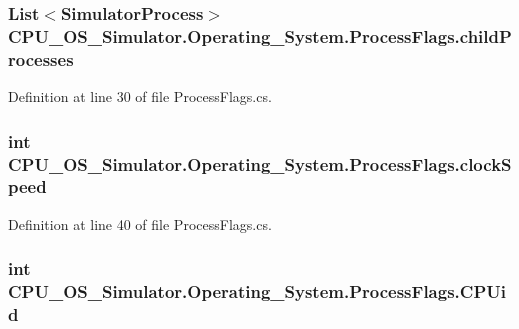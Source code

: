 \subsubsection[{child\+Processes}]{\setlength{\rightskip}{0pt plus 5cm}List$<${\bf Simulator\+Process}$>$ C\+P\+U\+\_\+\+O\+S\+\_\+\+Simulator.\+Operating\+\_\+\+System.\+Process\+Flags.\+child\+Processes}\label{struct_c_p_u___o_s___simulator_1_1_operating___system_1_1_process_flags_aae4b90a688d3ac4e6d3faea6cb275242}


Definition at line 30 of file Process\+Flags.\+cs.

\hypertarget{struct_c_p_u___o_s___simulator_1_1_operating___system_1_1_process_flags_a28dbea54b61ff7f12d5dc8c3c40f632d}{}
\subsubsection[{clock\+Speed}]{\setlength{\rightskip}{0pt plus 5cm}int C\+P\+U\+\_\+\+O\+S\+\_\+\+Simulator.\+Operating\+\_\+\+System.\+Process\+Flags.\+clock\+Speed}\label{struct_c_p_u___o_s___simulator_1_1_operating___system_1_1_process_flags_a28dbea54b61ff7f12d5dc8c3c40f632d}


Definition at line 40 of file Process\+Flags.\+cs.

\hypertarget{struct_c_p_u___o_s___simulator_1_1_operating___system_1_1_process_flags_a204157ba5a9571934344bef2378f88bf}{}
\subsubsection[{C\+P\+Uid}]{\setlength{\rightskip}{0pt plus 5cm}int C\+P\+U\+\_\+\+O\+S\+\_\+\+Simulator.\+Operating\+\_\+\+System.\+Process\+Flags.\+C\+P\+Uid}\label{struct_c_p_u___o_s___simulator_1_1_operating___system_1_1_process_flags_a204157ba5a9571934344bef2378f88bf}


